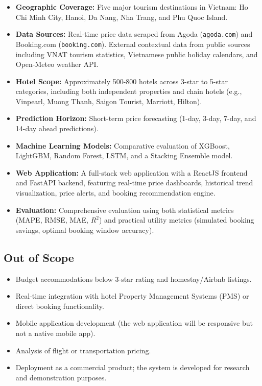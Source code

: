 \documentclass[12pt,a4paper]{report}
\begin{document}
\begin{itemize}
    \item \textbf{Geographic Coverage:} Five major tourism destinations in Vietnam: Ho Chi Minh City, Hanoi, Da Nang, Nha Trang, and Phu Quoc Island.
    \item \textbf{Data Sources:} Real-time price data scraped from Agoda (\texttt{agoda.com}) and Booking.com (\texttt{booking.com}). External contextual data from public sources including VNAT tourism statistics, Vietnamese public holiday calendars, and Open-Meteo weather API.
    \item \textbf{Hotel Scope:} Approximately 500-800 hotels across 3-star to 5-star categories, including both independent properties and chain hotels (e.g., Vinpearl, Muong Thanh, Saigon Tourist, Marriott, Hilton).
    \item \textbf{Prediction Horizon:} Short-term price forecasting (1-day, 3-day, 7-day, and 14-day ahead predictions).
    \item \textbf{Machine Learning Models:} Comparative evaluation of XGBoost, LightGBM, Random Forest, LSTM, and a Stacking Ensemble model.
    \item \textbf{Web Application:} A full-stack web application with a ReactJS frontend and FastAPI backend, featuring real-time price dashboards, historical trend visualization, price alerts, and booking recommendation engine.
    \item \textbf{Evaluation:} Comprehensive evaluation using both statistical metrics (MAPE, RMSE, MAE, $R^2$) and practical utility metrics (simulated booking savings, optimal booking window accuracy).
\end{itemize}

\subsection{Out of Scope}

\begin{itemize}
    \item Budget accommodations below 3-star rating and homestay/Airbnb listings.
    \item Real-time integration with hotel Property Management Systems (PMS) or direct booking functionality.
    \item Mobile application development (the web application will be responsive but not a native mobile app).
    \item Analysis of flight or transportation pricing.
    \item Deployment as a commercial product; the system is developed for research and demonstration purposes.
\end{itemize}
\end{document}
